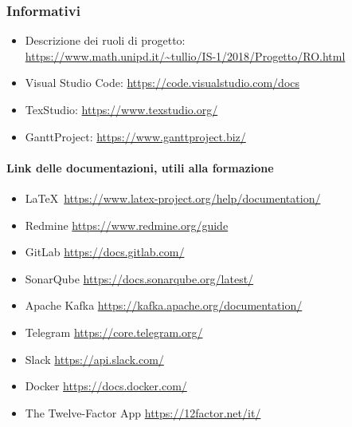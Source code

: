     \subsubsection{Informativi}	\label{rifinfo}
    \begin{itemize}
        \item Descrizione dei ruoli di progetto: \\\url{https://www.math.unipd.it/~tullio/IS-1/2018/Progetto/RO.html}
        \item Visual Studio Code: \url{https://code.visualstudio.com/docs}
        \item TexStudio: \url{https://www.texstudio.org/}
        \item GanttProject: \url{https://www.ganttproject.biz/}
	\end{itemize}

	\paragraph*{Link delle documentazioni, utili alla formazione}
	\begin{itemize}
		\item \LaTeX\ \url{https://www.latex-project.org/help/documentation/}
		\item Redmine \url{https://www.redmine.org/guide}
		\item GitLab \url{https://docs.gitlab.com/}
		\item SonarQube \url{https://docs.sonarqube.org/latest/}
		\item Apache Kafka \url{https://kafka.apache.org/documentation/}
		\item Telegram \url{https://core.telegram.org/}
		\item Slack \url{https://api.slack.com/}
		\item Docker \url{https://docs.docker.com/}
		\item The Twelve-Factor App \url{https://12factor.net/it/}
	\end{itemize}
